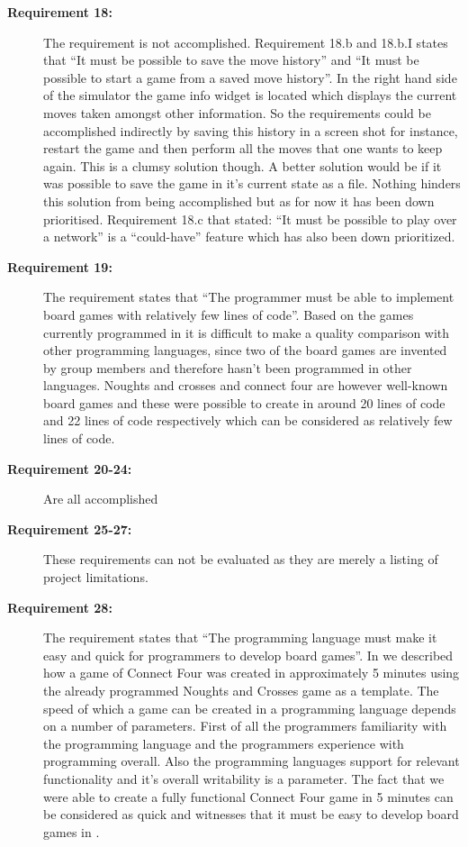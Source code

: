 \begin{description}
\item[\textbf{Requirement 18:}]
The requirement is not accomplished. Requirement 18.b and 18.b.I states that ``It must be possible to save the move history'' and ``It must be possible to start a game from a saved move history''. In the right hand side of the simulator the game info widget is located which displays the current moves taken amongst other information. So the requirements could be accomplished indirectly by saving this history in a screen shot for instance, restart the game and then perform all the moves that one wants to keep again. This is a clumsy solution though. A better solution would be if it was possible to save the game in it's current state as a file. Nothing hinders this solution from being accomplished but as for now it has been down prioritised. Requirement 18.c that stated: ``It must be possible to play over a network'' is a ``could-have'' feature which has also been down prioritized. 

\item[\textbf{Requirement 19:}]
The requirement states that ``The programmer must be able to implement board games with relatively few lines of code''. Based on the games currently programmed in \productname{} it is difficult to make a quality comparison with other programming languages, since two of the board games are invented by group members and therefore hasn't been programmed in other languages. Noughts and crosses and connect four are however well-known board games and these were possible to create in around 20 lines of code and 22 lines of code respectively which can be considered as relatively few lines of code.

\item[\textbf{Requirement 20-24:}]
Are all accomplished

\item[\textbf{Requirement 25-27:}]
These requirements can not be evaluated as they are merely a listing of project limitations. 

\item[\textbf{Requirement 28:}]
The requirement states that ``The programming language must make it easy and quick for programmers to develop board games''. In  we described how a game of Connect Four was created in approximately 5 minutes using the already programmed Noughts and Crosses game as a template. The speed of which a game can be created in a programming language depends on a number of parameters. First of all the programmers familiarity with the programming language and the programmers experience with programming overall. Also the programming languages support for relevant functionality and it's overall writability is a parameter. The fact that we were able to create a fully functional Connect Four game in 5 minutes can be considered as quick and witnesses that it must be easy to develop board games in \productname{}.


\end{description}
